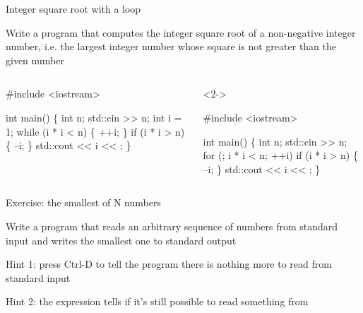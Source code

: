 \begin{frame}[fragile]{Integer square root with a  loop}

  Write a program that computes the integer square root of a non-negative
  integer number, i.e. the largest integer number whose square is not greater
  than the given number

  \begin{columns}[T]
    \begin{column}{.35\textwidth}
      \begin{codeblock}
#include <iostream>

int main()
\{
  int n;
  std::cin >{}> n;
  int i = 1;
  while (i * i < n) \{
    ++i;
  \}
  if (i * i > n) \{
    --i;
  \}
  std::cout << i << \bslashn;
\}\end{codeblock}
    \end{column}

    \begin{column}{.65\textwidth}
      \begin{codeblock}<2->{
#include <iostream>

int main()
\{
  int n;
  std::cin >{}> n;
  for (; i * i < n; ++i) 
  if (\alert<3>{i} * \alert<3>{i} > n) \{
    --\alert<3>{i};
  \}
  std::cout << i << \bslashn;
\}}\end{codeblock}
    \end{column}

  \end{columns}


\end{frame}

\begin{frame}{Exercise: the smallest of N numbers}

  Write a program that reads an arbitrary sequence of numbers from standard
  input and writes the smallest one to standard output

  Hint 1: press Ctrl-D to tell the program there is nothing more to read from
  standard input

  Hint 2: the expression  tells if it's still possible to
  read something from 
\end{frame}


